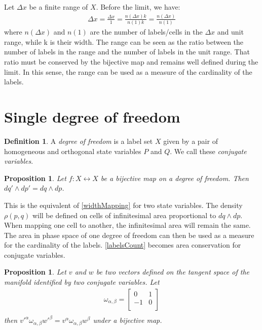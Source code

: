 \documentclass[aps,twocolumn,floatfix,nofootinbib]{revtex4}   %
\newtheorem{prop}[thm]{Proposition}
\theoremstyle{definition}
\newtheorem{defn}[thm]{Definition}
\begin{document}
Let $\Delta x$ be a finite range of $X$. Before the limit, we have:
\begin{align*}
\Delta x = \frac{\Delta x}{1} = \frac{n(\Delta x) k}{n(1) k} = \frac{n(\Delta x)}{n(1)}
\end{align*}
where $n(\Delta x)$ and $n(1)$ are the number of labels/cells in the $\Delta x$ and unit range, while k is their width. The range can be seen as the ratio between the number of labels in the range and the number of labels in the unit range. That ratio must be conserved by the bijective map and remains well defined during the limit. In this sense, the range can be used as a measure of the cardinality of the labels.

\section{Single degree of freedom}

\begin{defn}\label{sdof}
A \emph{degree of freedom} is a label set $X$ given by a pair of homogeneous and orthogonal state variables $P$ and $Q$. We call these \emph{conjugate variables}.
\end{defn}

\begin{prop}\label{sdofMap}
Let $f: X \leftrightarrow X$ be a bijective map on a degree of freedom. Then $dq' \wedge dp' = dq \wedge dp$.
\end{prop}

This is the equivalent of \ref{widthMapping} for two state variables. The density $\rho(p,q)$ will be defined on cells of infinitesimal area proportional to $dq \wedge dp$. When mapping one cell to another, the infinitesimal area will remain the same. The area in phase space of one degree of freedom can then be used as a measure for the cardinality of the labels. \ref{labelsCount} becomes area conservation for conjugate variables. 

\begin{prop}\label{sdofInvariant}
Let $v$ and $w$ be two vectors defined on the tangent space of the manifold identified by two conjugate variables. Let
\begin{align*}
\omega_{\alpha, \beta} = \left[
  \begin{array}{cc}
    0 & 1 \\
    -1 & 0 \\
  \end{array}
\right] \\
\end{align*}
then $v'^{\alpha} \omega_{\alpha, \beta} w'^{\beta}=v^{\alpha} \omega_{\alpha, \beta} w^{\beta}$ under a bijective map.
\end{prop}
\end{document}
